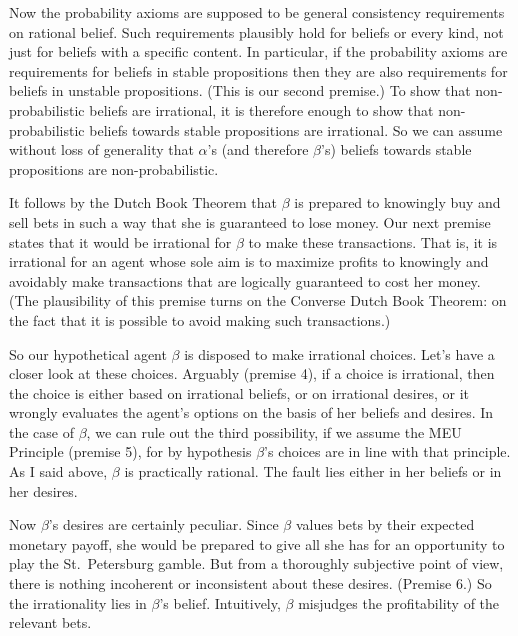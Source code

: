 
Now the probability axioms are supposed to be general consistency
requirements on rational belief. Such requirements plausibly hold for
beliefs or every kind, not just for beliefs with a specific
content. In particular, if the probability axioms are requirements for
beliefs in stable propositions then they are also requirements for
beliefs in unstable propositions. (This is our second premise.) To
show that non-probabilistic beliefs are irrational, it is therefore
enough to show that non-probabilistic beliefs towards stable
propositions are irrational. So we can assume without loss of
generality that $\alpha$'s (and therefore $\beta$'s) beliefs towards
stable propositions are non-probabilistic.

It follows by the Dutch Book Theorem that $\beta$ is prepared to
knowingly buy and sell bets in such a way that she is guaranteed to
lose money. Our next premise states that it would be irrational for
$\beta$ to make these transactions. That is, it is irrational for an
agent whose sole aim is to maximize profits to knowingly and avoidably
make transactions that are logically guaranteed to cost her
money. (The plausibility of this premise turns on the Converse Dutch
Book Theorem: on the fact that it is possible to avoid making such
transactions.)

So our hypothetical agent $\beta$ is disposed to make irrational
choices. Let's have a closer look at these choices. Arguably (premise
4), if a choice is irrational, then the choice is either based on
irrational beliefs, or on irrational desires, or it wrongly evaluates the
agent's options on the basis of her beliefs and desires. In the case
of $\beta$, we can rule out the third possibility, if we assume the
MEU Principle (premise 5), for by hypothesis $\beta$'s choices are in
line with that principle. As I said above, $\beta$ is practically
rational. The fault lies either in her beliefs or in her desires.

Now $\beta$'s desires are certainly peculiar. Since $\beta$ values
bets by their expected monetary payoff, she would be prepared to give
all she has for an opportunity to play the St.\ Petersburg gamble. But
from a thoroughly subjective point of view, there is nothing
incoherent or inconsistent about these desires. (Premise 6.) So the
irrationality lies in $\beta$'s belief. Intuitively, $\beta$ misjudges the
profitability of the relevant bets.

